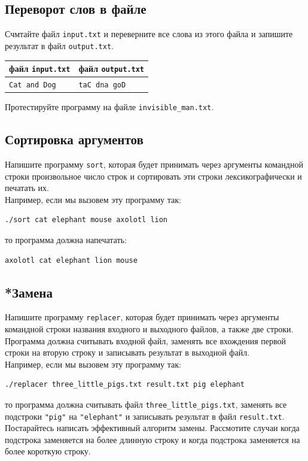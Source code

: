 \documentclass{article}
\begin{document}
\subsection{Переворот слов в файле}
Счмтайте файл \texttt{input.txt}  и переверните все слова из этого файла и запишите результат в файл \texttt{output.txt}.
\begin{center} 
\begin{tabular}{ l | l }
 файл \texttt{input.txt} & файл \texttt{output.txt} \\ \hline
 \texttt{Cat and Dog} & \texttt{taC dna goD}\\
\end{tabular}
\end{center}
Протестируйте программу на файле \texttt{invisible\_man.txt}.


\subsection{Сортировка аргументов}
Напишите программу \texttt{sort}, которая будет принимать через аргументы командной строки произвольное число строк и сортировать эти строки лексикографически и печатать их.\\
Например, если мы вызовем эту программу так:
\begin{verbatim}
./sort cat elephant mouse axolotl lion
\end{verbatim}
то программа должна напечатать:
\begin{verbatim}
axolotl cat elephant lion mouse
\end{verbatim}




\subsection{*Замена}
Напишите программу \texttt{replacer}, которая будет принимать через аргументы командной строки названия входного и выходного файлов, а также две строки. Программа должна считывать входной файл, заменять все вхождения первой строки на вторую строку и записывать результат в выходной файл.\\
Например, если мы вызовем эту программу так:
\begin{verbatim}
./replacer three_little_pigs.txt result.txt pig elephant
\end{verbatim}
то программа должна считывать файл \texttt{three\_little\_pigs.txt}, заменять все подстроки \texttt{"pig"} на \texttt{"elephant"} и записывать результат в файл \texttt{result.txt}. Постарайтесь написать эффективный алгоритм замены. Рассмотите случаи когда подстрока заменяется на более длинную строку и когда подстрока заменяется на более короткую строку.
\end{document}
